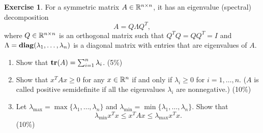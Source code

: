 \documentclass[12pt]{extarticle}
\theoremstyle{definition}
\newtheorem{exercise}{Exercise}
\begin{document}
\begin{exercise}
  For a symmetric matrix $A\in\mathbb{R}^{n\times n}$, it has an eigenvalue (spectral) decomposition
  $$A=Q\Lambda Q^T,$$
  where $Q\in\mathbb{R}^{n\times n}$ is an orthogonal matrix such that $Q^TQ=QQ^T=I$ and $\Lambda=\mathop{\bf diag}(\lambda_1,\dots,\lambda_n)$ is a diagonal matrix with entries that are eigenvalues of $A$.
  \begin{enumerate}[label=(\alph*)]
    \item Show that $\mathop{\bf tr}(A)=\sum_{i=1}^n\lambda_i$. (5\%)
    \item Show that $x^TAx\ge 0$ for any $x\in\mathbb{R}^n$ if and only if $\lambda_i\ge 0$ for $i=1,\dots,n$. ($A$ is called positive semidefinite if all the eigenvalues $\lambda_i$ are nonnegative.) (10\%)
    \item Let $\lambda_{\max}=\max\{\lambda_1,\dots,\lambda_n\}$ and $\lambda_{\min}=\min\{\lambda_1,\dots,\lambda_n\}$. Show that
          $$\lambda_{\min}x^Tx\le x^TAx\le \lambda_{\max}x^Tx.$$
          (10\%)
  \end{enumerate}
\end{exercise}
\newpage
\end{document}
